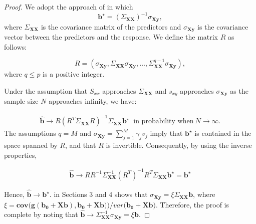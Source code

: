\documentclass[12pt]{article}
\begin{document}
\begin{proof}
We adopt the approach of \cite{naik2000partial} in which 
$$\mathbf{b}^\star = (\Sigma_{\mathbf{X}\mathbf{X}})^{-1}\sigma_{\mathbf{X}\mathbf{y}},$$
where $\Sigma_{\mathbf{X}\mathbf{X}}$ is the covariance matrix of the predictors and $\sigma_{\mathbf{X}\mathbf{y}}$ is the covariance vector between the predictors and the response. We define the matrix $R$ as follows:

$$R = (\sigma_{\mathbf{X}\mathbf{y}}, \Sigma_{\mathbf{X}\mathbf{X}}\sigma_{\mathbf{X}\mathbf{y}}, \dots, \Sigma_{\mathbf{X}\mathbf{X}}^{q-1}\sigma_{\mathbf{X}\mathbf{y}}),$$
where $q \leq p$ is a positive integer.

Under the assumption that $S_{xx}$ approaches $\Sigma_{\mathbf{X}\mathbf{X}}$ and $s_{xy}$ approaches $\sigma_{\mathbf{X}\mathbf{y}}$ as the sample size $N$ approaches infinity, we have:


\begin{align*}
    \hat{\mathbf{b}} \rightarrow R(R^T\Sigma_{\mathbf{X}\mathbf{X}}R)^{-1}\Sigma_{\mathbf{X}\mathbf{X}}\mathbf{b}^\star \ \text{ in probability when} \ N \rightarrow \infty. 
\end{align*}
The assumptions $q = M$ and $\sigma_{\mathbf{X}\mathbf{y}} = \sum_{j=1}^M\gamma_jv_j$ imply that $\mathbf{b}^\star$ is contained in the space spanned by $R$, and that $R$ is invertible. Consequently, by using the inverse properties,


\begin{align*}
    \hat{\mathbf{b}} \rightarrow R  R^{-1} \Sigma_{\mathbf{X}\mathbf{X}}^{-1} (R^T)^{-1} R^{T} \Sigma_{\mathbf{X}\mathbf{X}} \mathbf{b}^\star = \mathbf{b}^\star
\end{align*}

Hence, $\hat{\mathbf{b}} \rightarrow \mathbf{b}^\star$. \cite{brillinger2012generalized} in Sections 3 and 4 shows that $\sigma_{\mathbf{Xy}} = \xi \Sigma_{\mathbf{X}\mathbf{X}}\mathbf{b}$, where $\xi = \mathbf{cov\big(g(b_0 + \mathbf{X}\mathbf{b}), b_0 + \mathbf{X}\mathbf{b})\big)}/var\big(\mathbf{b_0 + \mathbf{X}\mathbf{b}}\big)$. Therefore, the proof is complete by noting that $\hat{\mathbf{b}} \rightarrow \Sigma_{\mathbf{X}\mathbf{X}}^{-1}\sigma_{\mathbf{X}\mathbf{y}} = \xi \mathbf{b}$. 

\end{proof}
\end{document}
